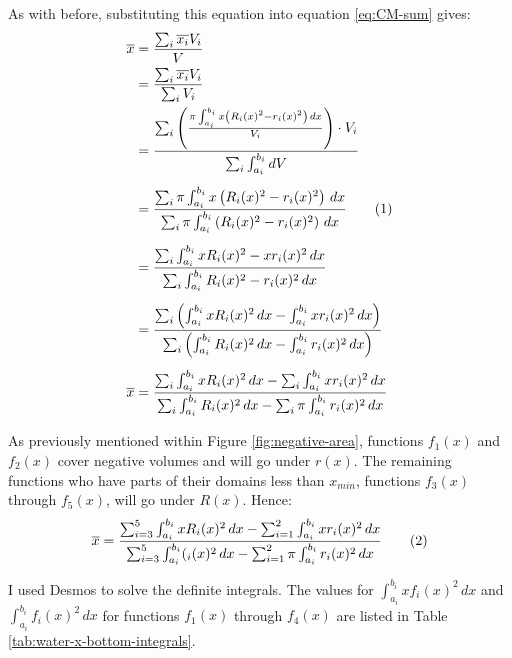 \documentclass[11pt]{article}
\newcommand{\numberthis}{\addtocounter{equation}{1}\tag{\theequation}}
\begin{document}
    As with before, substituting this equation into equation \eqref{eq:CM-sum} gives:
    {\footnotesize\begin{align*}
        \overline{x} &= \frac{\sum_i \overline{x_i} V_i}{V} \\
        &= \frac{\sum_i \overline{x_i} V_i}{\sum_i V_i} \\
        &= \frac{\sum_i \left( \frac{\pi \int_{a_i}^{b_i} x \left( R_i(x)^2 - r_i(x)^2 \right) \, dx}{V_i} \right) \cdot V_i}{\sum_i \int_{a_i}^{b_i} dV} \\[5pt]
        &= \frac{\sum_i \pi \int_{a_i}^{b_i} x \left( R_i(x)^2 - r_i(x)^2 \right) \, dx}{\sum_i \pi \int_{a_i}^{b_i} \left( R_i(x)^2 - r_i(x)^2 \right) \, dx} \numberthis{\label{eq:water-bot-vol}} \\[5pt]
        &= \frac{\sum_i \int_{a_i}^{b_i} x R_i(x)^2 - x r_i(x)^2 \, dx}{\sum_i \int_{a_i}^{b_i} R_i(x)^2 - r_i(x)^2 \, dx} \\[5pt]
        &= \frac{\sum_i \left( \int_{a_i}^{b_i} x R_i(x)^2 \, dx - \int_{a_i}^{b_i} x r_i(x)^2 \, dx \right)}{\sum_i \left( \int_{a_i}^{b_i} R_i(x)^2 \, dx - \int_{a_i}^{b_i} r_i(x)^2 \, dx \right)} \\[5pt]
        \overline{x} &= \frac{\sum_i \int_{a_i}^{b_i} x R_i(x)^2 \, dx - \sum_i \int_{a_i}^{b_i} x r_i(x)^2 \, dx}{\sum_i \int_{a_i}^{b_i} R_i(x)^2 \, dx - \sum_i \pi \int_{a_i}^{b_i} r_i(x)^2 \, dx}
    \end{align*}}
    \vspace{-14pt}

    As previously mentioned within Figure \ref{fig:negative-area}, functions $f_1(x)$ and $f_2(x)$ cover negative volumes and will go under $r(x)$. The remaining functions who have parts of their domains less than $x_{min}$, functions $f_3(x)$ through $f_5(x)$, will go under $R(x)$. Hence:
    {\footnotesize\[ \overline{x} = \frac{\sum_{i=3}^5 \int_{a_i}^{b_i} x R_i(x)^2 \, dx - \sum_{i=1}^2 \int_{a_i}^{b_i} x r_i(x)^2 \, dx}{\sum_{i=3}^5 \int_{a_i}^{b_i} (_i(x)^2 \, dx - \sum_{i=1}^2 \pi \int_{a_i}^{b_i} r_i(x)^2 \, dx} \numberthis{\label{eq:water-bottom-x-cm}} \]}

    I used Desmos to solve the definite integrals. The values for $\int_{a_i}^{b_i} x f_i(x)^2 \, dx$ and $\int_{a_i}^{b_i} f_i(x)^2 \, dx$ for functions $f_1(x)$ through $f_4(x)$ are listed in Table \ref{tab:water-x-bottom-integrals}.
\end{document}
